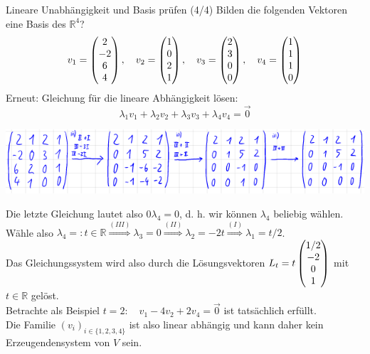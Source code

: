 \begin{Beispiel}
{Lineare Unabhängigkeit und Basis prüfen (4/4)}
Bilden die folgenden Vektoren eine Basis des $\mathbb{R}^4$?
\begin{equation*}
    v_1=\begin{pmatrix}2\\-2\\6\\4\end{pmatrix},\quad v_2=\begin{pmatrix}1\\0\\2\\1\end{pmatrix},\quad v_3=\begin{pmatrix}2\\3\\0\\0\end{pmatrix},\quad v_4=\begin{pmatrix}1\\1\\1\\0\end{pmatrix}
\end{equation*}
Erneut: Gleichung für die lineare Abhängigkeit lösen:
\begin{equation*}
     \lambda_1v_1+\lambda_2v_2+\lambda_3v_3+\lambda_4v_4=\Vec{0}
\end{equation*}
\begin{center}
    \includegraphics[width=.7\textwidth]{Dateien/00/11GaussD1.PNG}
\end{center}
Die letzte Gleichung lautet also $0\lambda_4=0$, d. h. wir können $\lambda_4$ beliebig wählen.\\
Wähle also $\lambda_4=:t\in\mathbb{R}\overset{(III)}{\Rightarrow}\boxed{\lambda_3=0}\overset{(II)}{\Rightarrow}\boxed{\lambda_2=-2t}\overset{(I)}{\Rightarrow}\boxed{\lambda_1=t/2}$.\\
Das Gleichungssystem wird also durch die Lösungsvektoren $L_t=t\begin{pmatrix}1/2\\-2\\0\\1\end{pmatrix}$ mit $t\in\mathbb{R}$ gelöst.\\
Betrachte als Beispiel $t=2:\quad v_1-4v_2+2v_4=\Vec{0}$ ist tatsächlich erfüllt.\\
Die Familie $(v_i)_{i\in\{1,2,3,4\}}$ ist also linear abhängig und kann daher kein Erzeugendensystem von $V$ sein.
\end{Beispiel}

